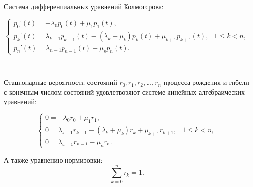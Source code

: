 Система дифференциальных уравнений Колмогорова:

\[
	\begin{cases}
		p_0'(t) = -\lambda_0 p_0(t) + \mu_1 p_1(t), \\[4pt]
		p_k'(t) = \lambda_{k-1} p_{k-1}(t)
		- (\lambda_k + \mu_k) p_k(t)
		+ \mu_{k+1} p_{k+1}(t),
		 & 1 \le k < n,                             \\[4pt]
		p_n'(t) = \lambda_{n-1} p_{n-1}(t) - \mu_n p_n(t).
	\end{cases}
\]

---

Стационарные вероятности состояний $r_0, r_1, r_2, \ldots, r_n$ процесса рождения и гибели
с конечным числом состояний удовлетворяют системе линейных алгебраических уравнений:

\[
	\begin{cases}
		0 = -\lambda_0 r_0 + \mu_1 r_1, \\[4pt]
		0 = \lambda_{k-1} r_{k-1} - (\lambda_k + \mu_k) r_k + \mu_{k+1} r_{k+1},
		 & 1 \le k < n,                 \\[4pt]
		0 = \lambda_{n-1} r_{n-1} - \mu_n r_n.
	\end{cases}
\]

А также уравнению нормировки:
\[
	\sum_{k=0}^{n} r_k = 1.
\]
